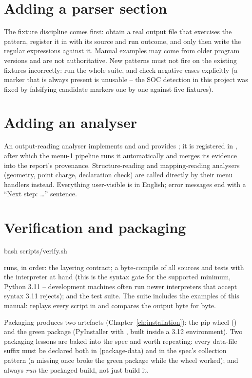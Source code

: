 \section{Adding a parser section}

The fixture discipline comes first: obtain a real output file that exercises
the pattern, register it in  with its source and
run outcome, and only then write the regular expressions against it. Manual
examples may come from older program versions and are not authoritative. New
patterns must not fire on the existing fixtures incorrectly: run the whole
suite, and check negative cases explicitly (a marker that is always present is
unusable -- the SOC detection in this project was fixed by falsifying candidate
markers one by one against five fixtures).

\section{Adding an analyser}

An output-reading analyser implements  and
 and provides ; it is
registered in , after which the menu-1 pipeline
runs it automatically and merges its evidence into the report's provenance.
Structure-reading and mapping-reading analysers (geometry, point charge,
declaration check) are called directly by their menu handlers instead.
Everything user-visible is in English; error messages end with a
``Next step: \dots'' sentence.

\section{Verification and packaging}

\begin{codeblock}
bash scripts/verify.sh
\end{codeblock}

runs, in order: the layering contract; a byte-compile of all sources and tests
with the interpreter at hand (this is the syntax gate for the supported
minimum, Python 3.11 -- development machines often run newer interpreters that
accept syntax 3.11 rejects); and the test suite. The suite includes the
examples of this manual:  replays every script in
 and compares the output byte for byte.

Packaging produces two artefacts (Chapter~\ref{ch:installation}): the pip wheel
() and the green package (PyInstaller with
, built inside a 3.12 environment). Two
packaging lessons are baked into the spec and worth repeating: every data-file
suffix must be declared both in  (package-data) and in the
spec's collection pattern (a missing  once broke the green package
while the wheel worked); and always \emph{run} the packaged build, not just
build it.


